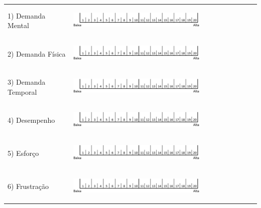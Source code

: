 \begin{table}[!h]
\centering
    \def\arraystretch{0.5}
    \begin{tabular}{m{} m{}}
        1) Demanda Mental & \begin{center}\includegraphics[width = 0.7\textwidth]{ApendC_(Questionarios)/Escala_NASA.png}\end{center}\\
        2) Demanda Física & \begin{center}\includegraphics[width = 0.7\textwidth]{ApendC_(Questionarios)/Escala_NASA.png}\end{center}\\
        3) Demanda Temporal & \begin{center}\includegraphics[width = 0.7\textwidth]{ApendC_(Questionarios)/Escala_NASA.png}\end{center}\\
        4) Desempenho     & \begin{center}\includegraphics[width = 0.7\textwidth]{ApendC_(Questionarios)/Escala_NASA.png}\end{center}\\
        5) Esforço        & \begin{center}\includegraphics[width = 0.7\textwidth]{ApendC_(Questionarios)/Escala_NASA.png}\end{center}\\
        6) Frustração     & \begin{center}\includegraphics[width = 0.7\textwidth]{ApendC_(Questionarios)/Escala_NASA.png}\end{center}\\
    \end{tabular}
\end{table}
\pagebreak

